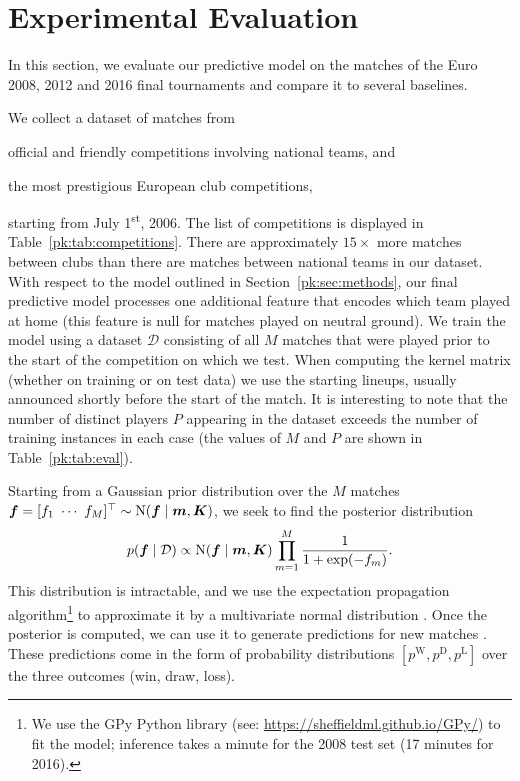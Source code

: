 \section{Experimental Evaluation}
\label{pk:sec:evaluation}

In this section, we evaluate our predictive model on the matches of the Euro 2008, 2012 and 2016 final tournaments and compare it to several baselines.

We collect a dataset of matches from
\begin{enuminline}
\item official and friendly competitions involving national teams, and
\item the most prestigious European club competitions,
\end{enuminline}
starting from July 1\textsuperscript{st}, 2006.
The list of competitions is displayed in Table~\ref{pk:tab:competitions}.
There are approximately $15 \times$ more matches between clubs than there are matches between national teams in our dataset.
With respect to the model outlined in Section~\ref{pk:sec:methods}, our final predictive model processes one additional feature that encodes which team played at home (this feature is null for matches played on neutral ground).
We train the model using a dataset $\mathcal{D}$ consisting of all $M$ matches that were played prior to the start of the competition on which we test.
When computing the kernel matrix (whether on training or on test data) we use the starting lineups, usually announced shortly before the start of the match.
It is interesting to note that the number of distinct players $P$ appearing in the dataset exceeds the number of training instances in each case (the values of $M$ and $P$ are shown in Table~\ref{pk:tab:eval}).

Starting from a Gaussian prior distribution over the $M$ matches $\bm{f} = [f_1 \ \cdots \ f_M]^\top \sim \mathrm{N}( \bm{f} \mid \bm{m}, \bm{K} )$, we seek to find the posterior distribution
\begin{align*}
p(\bm{f} \mid \mathcal{D}) \propto \mathrm{N}( \bm{f} \mid \bm{m}, \bm{K} ) \prod_{m = 1}^M \frac{1}{1 + \exp(- f_m)}.
\end{align*}
This distribution is intractable, and we use the expectation propagation algorithm\footnote{%
We use the GPy Python library (see: \url{https://sheffieldml.github.io/GPy/}) to fit the model; inference takes a minute for the 2008 test set (17 minutes for 2016).}
to approximate it by a multivariate normal distribution \citep{minka2001family}.
Once the posterior is computed, we can use it to generate predictions for new matches \citep{rasmussen2006gaussian}.
These predictions come in the form of probability distributions $[p^{\text{W}}, p^{\text{D}}, p^{\text{L}}]$ over the three outcomes (win, draw, loss).

